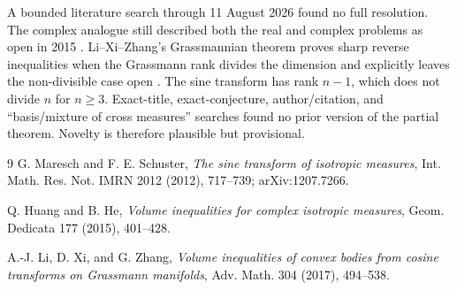 \documentclass[11pt]{article}
\begin{document}
A bounded literature search through 11 August 2026 found no full resolution.
The complex analogue still described both the real and complex problems as
open in 2015 \cite{HH}.  Li--Xi--Zhang's Grassmannian theorem proves sharp
reverse inequalities when the Grassmann rank divides the dimension and
explicitly leaves the non-divisible case open \cite[Theorem 1.2]{LXZ}.
The sine transform has rank $n-1$, which does not divide $n$ for $n\ge3$.
Exact-title, exact-conjecture, author/citation, and
``basis/mixture of cross measures'' searches found no prior version of the
partial theorem.  Novelty is therefore plausible but provisional.

\begin{thebibliography}{9}
G. Maresch and F. E. Schuster,
\emph{The sine transform of isotropic measures},
Int. Math. Res. Not. IMRN 2012 (2012), 717--739;
arXiv:1207.7266.

Q. Huang and B. He,
\emph{Volume inequalities for complex isotropic measures},
Geom. Dedicata 177 (2015), 401--428.

A.-J. Li, D. Xi, and G. Zhang,
\emph{Volume inequalities of convex bodies from cosine transforms on
Grassmann manifolds}, Adv. Math. 304 (2017), 494--538.
\end{thebibliography}
\end{document}
